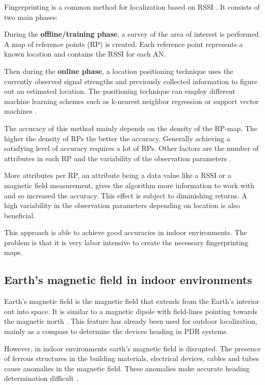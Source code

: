 Fingerprinting is a common method for localization based on RSSI \cite{chapre2013RSSI}. It consists of two main phases:

During the \textbf{offline/training phase}, a survey of the area of interest is performed. A map of reference points (RP) is created. Each reference point represents a known location and contains the RSSI for each AN.

Then during the \textbf{online phase}, a location positioning technique uses the currently observed signal strengths and previously collected information to figure out an estimated location. The positioning technique can employ different machine learning schemes such as k-nearest neighbor regression or support vector machines \cite{JoseMaster,surveyIndoorTechniques}.

The accuracy of this method mainly depends on the density of the RP-map. The higher the density of RPs the better the accuracy. Generally achieving a satisfying level of accuracy requires a lot of RPs. Other factors are the number of attributes in each RP and the variability of the observation parameters \cite{Li2012feasableMagnetic}.

More attributes per RP, an attribute being a data value like a RSSI or a magnetic field measurement, gives the algorithm more information to work with and so increased the accuracy\cite{Li2012feasableMagnetic}. This effect is subject to diminishing returns\cite{brouwers2014incremental}. A high variability in the observation parameters depending on location is also beneficial.

This approach is able to achieve good accuracies in indoor environments. The problem is that it is very labor intensive to create the necessary fingerprinting maps.

\subsection{Earth's magnetic field in indoor environments}

Earth's magnetic field is the magnetic field that extends from the Earth's interior out into space. It is similar to a magnetic dipole with field-lines pointing towards the magnetic north \citep{EarthMagnetwikipedia}. This feature has already been used for outdoor localization, mainly as a compass to determine the devices heading in PDR systems.

However, in indoor environments earth's magnetic field is disrupted. The presence of ferrous structures in the building materials, electrical devices, cables and tubes cause anomalies in the magnetic field. These anomalies make accurate heading determination difficult \citep{afzal2010assessment}.


